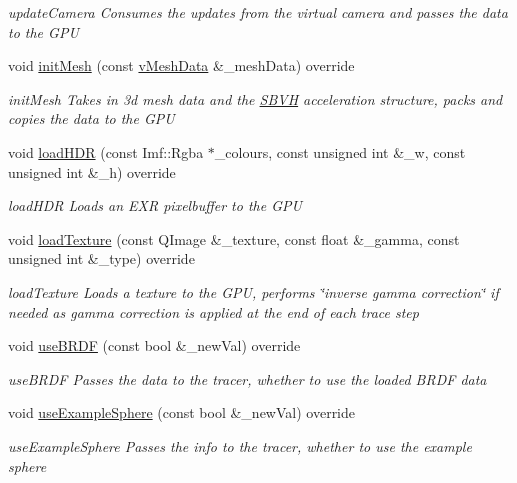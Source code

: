 \begin{DoxyCompactItemize}
\begin{DoxyCompactList}\small\item\em update\-Camera Consumes the updates from the virtual camera and passes the data to the G\-P\-U \end{DoxyCompactList}\item 
void \hyperlink{classvRendererCL_a06033a095680d83224fa3d12b703d213}{init\-Mesh} (const \hyperlink{structvMeshData}{v\-Mesh\-Data} \&\-\_\-mesh\-Data) override
\begin{DoxyCompactList}\small\item\em init\-Mesh Takes in 3d mesh data and the \hyperlink{classSBVH}{S\-B\-V\-H} acceleration structure, packs and copies the data to the G\-P\-U \end{DoxyCompactList}\item 
void \hyperlink{classvRendererCL_a4df104a5f4a9e19db7d9c8678ada7cd6}{load\-H\-D\-R} (const Imf\-::\-Rgba $\ast$\-\_\-colours, const unsigned int \&\-\_\-w, const unsigned int \&\-\_\-h) override
\begin{DoxyCompactList}\small\item\em load\-H\-D\-R Loads an E\-X\-R pixelbuffer to the G\-P\-U \end{DoxyCompactList}\item 
void \hyperlink{classvRendererCL_aeb2feac32793ba1ab9c74ff3abf9ff78}{load\-Texture} (const Q\-Image \&\-\_\-texture, const float \&\-\_\-gamma, const unsigned int \&\-\_\-type) override
\begin{DoxyCompactList}\small\item\em load\-Texture Loads a texture to the G\-P\-U, performs \char`\"{}inverse gamma correction\char`\"{} if needed as gamma correction is applied at the end of each trace step \end{DoxyCompactList}\item 
void \hyperlink{classvRendererCL_ad08264f1738f5a2effdef21fc3852758}{use\-B\-R\-D\-F} (const bool \&\-\_\-new\-Val) override
\begin{DoxyCompactList}\small\item\em use\-B\-R\-D\-F Passes the data to the tracer, whether to use the loaded B\-R\-D\-F data \end{DoxyCompactList}\item 
void \hyperlink{classvRendererCL_ace3572b0e58f9ef81ad3853a719d8537}{use\-Example\-Sphere} (const bool \&\-\_\-new\-Val) override
\begin{DoxyCompactList}\small\item\em use\-Example\-Sphere Passes the info to the tracer, whether to use the example sphere \end{DoxyCompactList}\item 

\end{DoxyCompactItemize}
